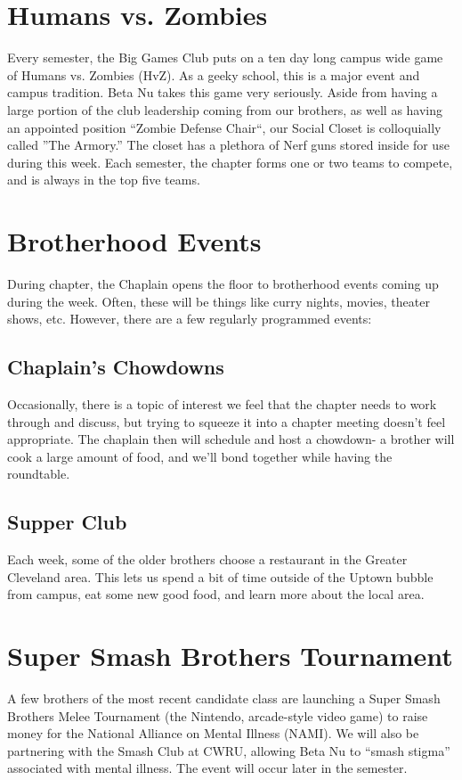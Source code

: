   \section*{Humans vs. Zombies}
     
    Every semester, the Big Games Club puts on a ten day long campus wide game of Humans vs. Zombies (HvZ). As a geeky school, this is a major event and campus tradition. Beta Nu takes this game very seriously. Aside from having a large portion of the club leadership coming from our brothers, as well as having an appointed position ``Zombie Defense Chair``, our Social Closet is colloquially called ''The Armory.'' The closet has a plethora of Nerf guns stored inside for use during this week. Each semester, the chapter forms one or two teams to compete, and is always in the top five teams.
    
  \section*{Brotherhood Events}
    
    During chapter, the Chaplain opens the floor to brotherhood events coming up during the week. Often, these will be things like curry nights, movies, theater shows, etc. However, there are a few regularly programmed events:
    
    \subsection*{Chaplain's Chowdowns}
      Occasionally, there is a topic of interest we feel that the chapter needs to work through and discuss, but trying to squeeze it into a chapter meeting doesn’t feel appropriate. The chaplain then will schedule and host a chowdown- a brother will cook a large amount of food, and we'll bond together while having the roundtable.
      
    \subsection*{Supper Club}
      Each week, some of the older brothers choose a restaurant in the Greater Cleveland area. This lets us spend a bit of time outside of the Uptown bubble from campus, eat some new good food, and learn more about the local area.
      
  \section*{Super Smash Brothers Tournament}
    A few brothers of the most recent candidate class are launching a Super Smash Brothers Melee Tournament (the Nintendo, arcade-style video game) to raise money for the National Alliance on Mental Illness (NAMI). We will also be partnering with the Smash Club at CWRU, allowing Beta Nu to “smash stigma” associated with mental illness. The event will occur later in the semester.